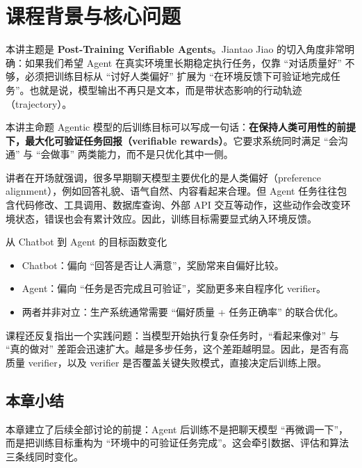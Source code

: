 \section{课程背景与核心问题}

本讲主题是 \textbf{Post-Training Verifiable Agents}。Jiantao Jiao 的切入角度非常明确：如果我们希望 Agent 在真实环境里长期稳定执行任务，仅靠 ``对话质量好'' 不够，必须把训练目标从 ``讨好人类偏好'' 扩展为 ``在环境反馈下可验证地完成任务''。也就是说，模型输出不再只是文本，而是带状态影响的行动轨迹（trajectory）。

\begin{importantbox}{本讲主命题}
Agentic 模型的后训练目标可以写成一句话：\textbf{在保持人类可用性的前提下，最大化可验证任务回报（verifiable rewards）}。它要求系统同时满足 ``会沟通'' 与 ``会做事'' 两类能力，而不是只优化其中一侧。
\end{importantbox}

讲者在开场就强调，很多早期聊天模型主要优化的是人类偏好（preference alignment），例如回答礼貌、语气自然、内容看起来合理。但 Agent 任务往往包含代码修改、工具调用、数据库查询、外部 API 交互等动作，这些动作会改变环境状态，错误也会有累计效应。因此，训练目标需要显式纳入环境反馈。

\begin{knowledgebox}{从 Chatbot 到 Agent 的目标函数变化}
\begin{itemize}
    \item Chatbot：偏向 ``回答是否让人满意''，奖励常来自偏好比较。
    \item Agent：偏向 ``任务是否完成且可验证''，奖励更多来自程序化 verifier。
    \item 两者并非对立：生产系统通常需要 ``偏好质量 + 任务正确率'' 的联合优化。
\end{itemize}
\end{knowledgebox}

课程还反复指出一个实践问题：当模型开始执行复杂任务时，``看起来像对'' 与 ``真的做对'' 差距会迅速扩大。越是多步任务，这个差距越明显。因此，是否有高质量 verifier，以及 verifier 是否覆盖关键失败模式，直接决定后训练上限。

\subsection{本章小结}
本章建立了后续全部讨论的前提：Agent 后训练不是把聊天模型 ``再微调一下''，而是把训练目标重构为 ``环境中的可验证任务完成''。这会牵引数据、评估和算法三条线同时变化。

